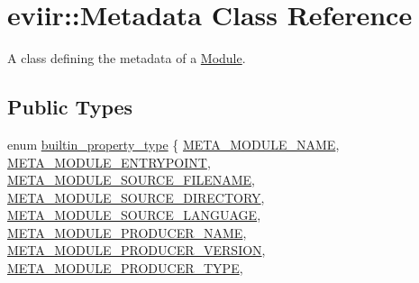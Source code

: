\hypertarget{classeviir_1_1Metadata}{}\section{eviir\+:\+:Metadata Class Reference}
\label{classeviir_1_1Metadata}


A class defining the metadata of a \hyperlink{classeviir_1_1Module}{Module}.  


\subsection*{Public Types}
\begin{DoxyCompactItemize}
\item 
enum \hyperlink{classeviir_1_1Metadata_a372fe4af91ebc18a6d02354e8bcf23cf}{builtin\+\_\+property\+\_\+type} \{ \newline
\hyperlink{classeviir_1_1Metadata_a372fe4af91ebc18a6d02354e8bcf23cfab74b3d0d418e4382dc31e2ec0a971999}{M\+E\+T\+A\+\_\+\+M\+O\+D\+U\+L\+E\+\_\+\+N\+A\+ME}, 
\newline
\hyperlink{classeviir_1_1Metadata_a372fe4af91ebc18a6d02354e8bcf23cfabe2badced095f48ee8e7c2c7d67dd076}{M\+E\+T\+A\+\_\+\+M\+O\+D\+U\+L\+E\+\_\+\+E\+N\+T\+R\+Y\+P\+O\+I\+NT}, 
\newline
\hyperlink{classeviir_1_1Metadata_a372fe4af91ebc18a6d02354e8bcf23cfaa4c98efe507cf0505d60cdb343adf91d}{M\+E\+T\+A\+\_\+\+M\+O\+D\+U\+L\+E\+\_\+\+S\+O\+U\+R\+C\+E\+\_\+\+F\+I\+L\+E\+N\+A\+ME}, 
\newline
\hyperlink{classeviir_1_1Metadata_a372fe4af91ebc18a6d02354e8bcf23cfad817637faca96aa70195396a0c6c3c4e}{M\+E\+T\+A\+\_\+\+M\+O\+D\+U\+L\+E\+\_\+\+S\+O\+U\+R\+C\+E\+\_\+\+D\+I\+R\+E\+C\+T\+O\+RY}, 
\newline
\hyperlink{classeviir_1_1Metadata_a372fe4af91ebc18a6d02354e8bcf23cfacf7fdcaa5ed555d3d97fc79276417234}{M\+E\+T\+A\+\_\+\+M\+O\+D\+U\+L\+E\+\_\+\+S\+O\+U\+R\+C\+E\+\_\+\+L\+A\+N\+G\+U\+A\+GE}, 
\newline
\hyperlink{classeviir_1_1Metadata_a372fe4af91ebc18a6d02354e8bcf23cfaa665ac35c0944d7bccca7f7430b6947f}{M\+E\+T\+A\+\_\+\+M\+O\+D\+U\+L\+E\+\_\+\+P\+R\+O\+D\+U\+C\+E\+R\+\_\+\+N\+A\+ME}, 
\newline
\hyperlink{classeviir_1_1Metadata_a372fe4af91ebc18a6d02354e8bcf23cfac60c0ed594013e96d929a33813f62773}{M\+E\+T\+A\+\_\+\+M\+O\+D\+U\+L\+E\+\_\+\+P\+R\+O\+D\+U\+C\+E\+R\+\_\+\+V\+E\+R\+S\+I\+ON}, 
\newline
\hyperlink{classeviir_1_1Metadata_a372fe4af91ebc18a6d02354e8bcf23cfa92111e61fcb0fbda98d3da2d5e43017c}{M\+E\+T\+A\+\_\+\+M\+O\+D\+U\+L\+E\+\_\+\+P\+R\+O\+D\+U\+C\+E\+R\+\_\+\+T\+Y\+PE}, 

\end{DoxyCompactItemize}

